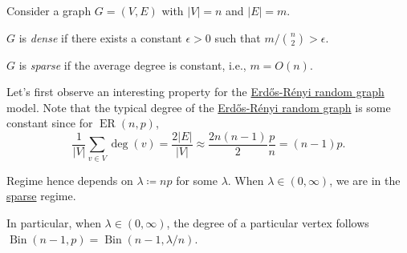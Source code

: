 \begin{definition*}
	Consider a graph \(G = (V, E)\) with \(\lvert V \rvert = n\) and \(\lvert E \rvert = m\).
	\begin{definition}\label{def:dense-graph}
		\(G\) is \emph{dense} if there exists a constant \(\epsilon > 0\) such that \(m / \binom{n}{2} > \epsilon \).
	\end{definition}

	\begin{definition}\label{def:sparse-graph}
		\(G\) is \emph{sparse} if the average degree is constant, i.e., \(m = O(n)\).
	\end{definition}
\end{definition*}

Let's first observe an interesting property for the \hyperref[def:Erdős-Rényi-random-graph]{Erdős-Rényi random graph} model. Note that the typical degree of the \hyperref[def:Erdős-Rényi-random-graph]{Erdős-Rényi random graph} is some constant since for \(\operatorname{ER}(n, p)\),
\[
	\frac{1}{\lvert V \rvert } \sum_{v \in V} \deg (v)
	= \frac{2 \lvert E \rvert }{\lvert V \rvert }
	\approx \frac{2 n (n-1)}{2} \frac{p}{n}
	= (n-1) p.
\]

\begin{note}
	Regime hence depends on \(\lambda \coloneqq np\) for some \(\lambda \). When \(\lambda \in (0, \infty )\), we are in the \hyperref[def:sparse-graph]{sparse} regime.
\end{note}

In particular, when \(\lambda \in (0, \infty )\), the degree of a particular vertex follows \(\operatorname{Bin}(n-1, p) = \operatorname{Bin}(n-1, \lambda / n) \).

